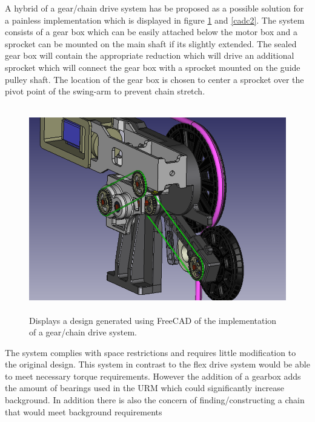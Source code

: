 \documentclass[paper=a4, fontsize=11pt]{scrartcl}
\numberwithin{equation}{section}		%
\numberwithin{figure}{section}			%
\numberwithin{table}{section}				%
\begin{document}
        A hybrid of a gear/chain drive system has be proposed as a possible solution for a painless implementation which is displayed in figure \ref{cadc} and \ref{cadc2}. The system consists of a gear  box which can be easily attached below the motor box and a sprocket can be mounted on the main shaft if its slightly extended. The sealed gear box will contain the appropriate reduction which will drive an additional sprocket which will connect the gear box with a sprocket mounted on the guide pulley shaft. The location of the gear box is chosen to center a sprocket over the pivot point of the swing-arm to prevent chain stretch.  
    \begin{figure}[H]
                \includegraphics[height=9cm]{URM1}
                \caption{Displays a design generated using FreeCAD of the implementation of a gear/chain drive system.}
				\label{cadc}
        \end{figure}
         The system complies with space restrictions and requires little modification to the original design. This system in contrast to the flex drive system would be able to meet necessary torque requirements. However the addition of a gearbox adds the amount of bearings used in the URM which could significantly increase background. In addition there is also the concern of finding/constructing a chain that would meet background requirements
\end{document}
